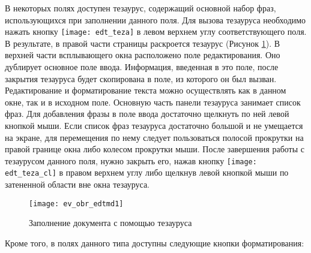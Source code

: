 {\begin{enumerate}
 В некоторых полях доступен тезаурус, содержащий основной набор фраз, использующихся при заполнении данного поля. Для вызова тезауруса необходимо нажать кнопку \texttt{[image: edt\_teza]} в левом верхнем углу соответствующего поля. В результате, в правой части страницы раскроется тезаурус (Рисунок \ref{img_ev_obr_edtmd1}). В верхней части всплывающего окна расположено поле редактирования. Оно дублирует основное поле ввода. Информация, введенная в это поле, после закрытия тезауруса будет скопирована в поле, из которого он был вызван. Редактирование и форматирование текста можно осуществлять как в данном окне, так и в исходном поле. Основную часть панели тезауруса занимает список фраз. Для добавления фразы в поле ввода достаточно щелкнуть по ней левой кнопкой мыши. Если список фраз тезауруса достаточно большой и не умещается на экране, для перемещения по нему следует пользоваться полосой прокрутки на правой границе окна либо колесом прокрутки мыши. После завершения работы с тезаурусом данного поля, нужно закрыть его, нажав кнопку \texttt{[image: edt\_teza\_cl]} в правом верхнем углу либо щелкнув левой кнопкой мыши по затененной области вне окна тезауруса. 
 
  \begin{figure}[ht!]\centering
   \texttt{[image: ev\_obr\_edtmd1]}
   \caption{Заполнение документа с помощью тезауруса}
   \label{img_ev_obr_edtmd1}
  \end{figure}
  
 Кроме того, в полях данного типа доступны следующие кнопки форматирования:
 

\end{enumerate}}
